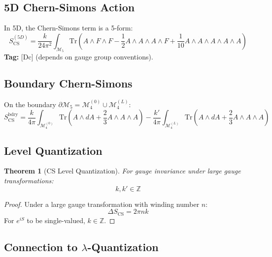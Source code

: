 \documentclass[11pt,a4paper]{article}
\newtheorem{theorem}{Theorem}[section]
\begin{document}
\subsection{5D Chern-Simons Action}

In 5D, the Chern-Simons term is a 5-form:
\begin{equation}
  S_{\text{CS}}^{(5D)} = \frac{k}{24\pi^2} \int_{\mathcal{M}_5} \text{Tr}\left(
    A \wedge F \wedge F - \frac{1}{2} A \wedge A \wedge A \wedge F
    + \frac{1}{10} A \wedge A \wedge A \wedge A \wedge A
  \right)
  \label{eq:cs-5d}
\end{equation}
\textbf{Tag:} [Dc] (depends on gauge group conventions).

\subsection{Boundary Chern-Simons}

On the boundary $\partial\mathcal{M}_5 = \mathcal{M}_4^{(0)} \cup \mathcal{M}_4^{(L)}$:
\begin{equation}
  S_{\text{CS}}^{\text{bdry}} = \frac{k}{4\pi} \int_{\mathcal{M}_4^{(0)}} \text{Tr}\left(
    A \wedge dA + \frac{2}{3} A \wedge A \wedge A \right)
  - \frac{k'}{4\pi} \int_{\mathcal{M}_4^{(L)}} \text{Tr}\left(
    A \wedge dA + \frac{2}{3} A \wedge A \wedge A \right)
  \label{eq:cs-bdry}
\end{equation}

\subsection{Level Quantization}

\begin{theorem}[CS Level Quantization]
\label{thm:cs-quantization}
For gauge invariance under large gauge transformations:
\begin{equation}
  k, k' \in \mathbb{Z}
  \label{eq:level-quantization}
\end{equation}
\end{theorem}

\begin{proof}
Under a large gauge transformation with winding number $n$:
\begin{equation}
  \Delta S_{\text{CS}} = 2\pi n k
  \label{eq:cs-variation}
\end{equation}
For $e^{iS}$ to be single-valued, $k \in \mathbb{Z}$.
\end{proof}

\subsection{Connection to $\lambda$-Quantization}
\end{document}
